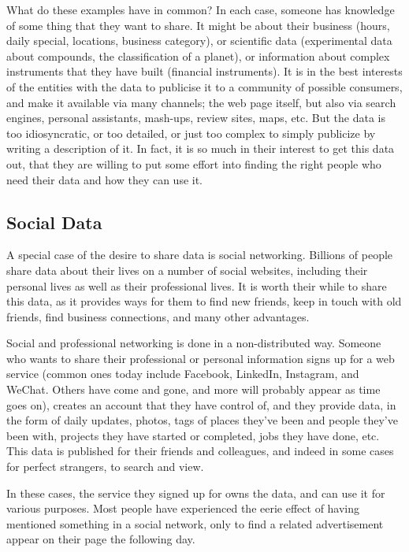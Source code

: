 What do these examples have in common?  In each case, someone has knowledge of some thing that 
they want to share.  It might be about their business (hours, daily special, locations, business category), or 
scientific data (experimental data about compounds, the classification of a planet), or information 
about complex instruments that they have built (financial instruments).   It is in the best interests
of the entities with the data to publicise it to a community of possible consumers, and make it available 
via many channels; the web page itself, but also via search engines, personal assistants, mash-ups, 
review sites, maps, etc.  But the 
data is too idiosyncratic, or too detailed, or just too complex to simply publicize by writing a description
of it.   In fact, it is so much in their interest to get this data out, that they are willing to 
put some effort into finding the right people who need their data and how they can use it. 


\subsection{Social Data}

A special case of the desire to share data is social networking.  Billions of 
people share data about their lives on a number of social websites, including 
their personal lives as well as their professional lives.  It is worth their 
while to share this data, as it provides ways for them to find new friends, keep
in touch with old friends, find business connections, and many other advantages. 

Social and professional networking is done in a non-distributed way.  Someone 
who wants to share their professional or personal information signs up for a web 
service (common ones today include Facebook,  LinkedIn, Instagram, and WeChat.  Others have come and gone,
and more will probably appear as time goes on), creates an account that they have control of, and 
they provide data, in the 
form of daily updates, photos, tags of places they've  been and people they've been with, 
projects they have started or completed, jobs they have done, etc.  This data is 
published for their friends and colleagues, and indeed in some cases for perfect strangers, to 
search and view. 

In these cases, the service they signed up for owns the data, and can use it for 
various purposes.  Most people have experienced the eerie effect of having mentioned
something in a social network, only to find a related advertisement appear on their
page the following day. 

